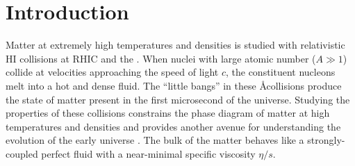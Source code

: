 \chapter{Introduction}
\label{ch:intro}


 


Matter at extremely high temperatures and densities is studied with relativistic \ac{HI} collisions at \ac{RHIC} and the \lhc.
When nuclei with large atomic number ($A \gg 1$) collide at velocities approaching the speed of light $c$, the constituent nucleons melt into a hot and dense fluid.
The ``little bangs'' in these \AA collisions produce the state of matter present in the first microsecond of the universe.
Studying the properties of these collisions constrains the phase diagram of matter at high temperatures and densities and provides another avenue for understanding the evolution of the early universe \cite{Busza:2018rrf}.
The bulk of the matter behaves like a strongly-coupled perfect fluid with a near-minimal specific viscosity $\eta/s$.

